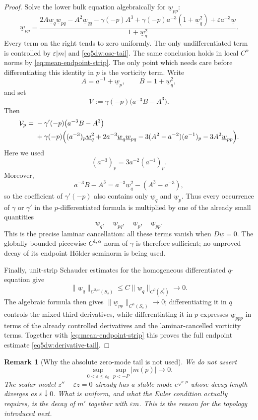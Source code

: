 \documentclass[11pt,reqno]{amsart}
\numberwithin{equation}{section}
\newtheorem{remark}[theorem]{Remark}
\theoremstyle{definition}
\theoremstyle{remark}
\begin{document}
\begin{proof}
Solve the lower bulk equation algebraically for $\underline w_{pp}$:
\[
 \underline w_{pp}=\frac{
  2A\underline w_q\underline w_{pq}-A^2\underline w_{qq}
  -\gamma(-p)A^3+\gamma(-p)a^{-3}(1+\underline w_q^2)
  +\varepsilon a^{-3}\underline w}{1+\underline w_q^2}.
\]
Every term on the right tends to zero uniformly.  The only
undifferentiated term is controlled by $\varepsilon|m|$ and
\eqref{eq5dw:osc-tail}.  The same conclusion holds in local
$C^\alpha$ norms by \eqref{eq:mean-endpoint-strip}.  The only point which needs care before differentiating this
identity in $p$ is the vorticity term.  Write
\[
 A=a^{-1}+\underline w_p,\qquad B=1+\underline w_q^2,
\]
and set
\[
 \mathcal V:=\gamma(-p)\bigl(a^{-3}B-A^3\bigr).
\]
Then
\[
 \begin{aligned}
 \mathcal V_p
 ={}&-\gamma'(-p)\bigl(a^{-3}B-A^3\bigr)\\
 &+\gamma(-p)\Bigl(
 (a^{-3})_p\underline w_q^2
 +2a^{-3}\underline w_q\underline w_{pq}
 -3(A^2-a^{-2})(a^{-1})_p
 -3A^2\underline w_{pp}
 \Bigr).
 \end{aligned}
\]
Here we used
\[
 (a^{-3})_p=3a^{-2}(a^{-1})_p.
\]
Moreover,
\[
 a^{-3}B-A^3
 =a^{-3}\underline w_q^2-(A^3-a^{-3}),
\]
so the coefficient of $\gamma'(-p)$ also contains only
$\underline w_q$ and $\underline w_p$.  Thus every occurrence of
$\gamma$ or $\gamma'$ in the $p$-differentiated formula is multiplied
by one of the already small quantities
\[
 \underline w_q,\quad \underline w_{pq},\quad
 \underline w_p,\quad \underline w_{pp}.
\]
This is the precise laminar cancellation: all these terms vanish when
$D\underline w=0$.  The globally bounded piecewise
$C^{1,\alpha}$ norm of $\gamma$ is therefore sufficient; no unproved
decay of its endpoint H\"older seminorm is being used.

Finally, unit-strip Schauder estimates for the homogeneous
differentiated $q$-equation give
\[
 \|\underline w_q\|_{C^{2,\alpha}(S_s)}
 \le C\|\underline w_q\|_{C^0(S_s^*)}\longrightarrow0.
\]
The algebraic formula then gives
$\|\underline w_{pp}\|_{C^\alpha(S_s)}\to0$; differentiating it in
$q$ controls the mixed third derivatives, while differentiating it
in $p$ expresses $\underline w_{ppp}$ in terms of the already
controlled derivatives and the laminar-cancelled vorticity terms.
Together with \eqref{eq:mean-endpoint-strip} this proves the full
endpoint estimate \eqref{eq5dw:derivative-tail}.
\end{proof}

\begin{remark}[Why the absolute zero-mode tail is not used]
\label{rem5dw:no-absolute-tail}
We do not assert
\[
 \sup_{0<\varepsilon\le\varepsilon_0}\sup_{p<-P}|m(p)|\to0.
\]
The scalar model $z''-\varepsilon z=0$ already has a stable mode
$e^{\sqrt\varepsilon p}$ whose decay length diverges as
$\varepsilon\downarrow0$.  What is uniform, and what the Euler
condition actually requires, is the decay of $m'$ together with
$\varepsilon m$.  This is the reason for the topology introduced next.
\end{remark}
\end{document}
